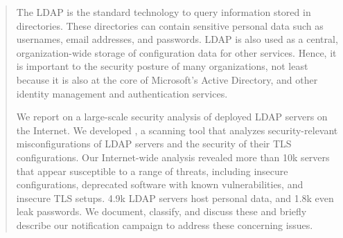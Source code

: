 \begin{abstract}
The \acrfull{LDAP} is the standard technology to query information stored in directories. These directories can contain sensitive personal data such as usernames, email addresses, and passwords. LDAP is also used as a central, organization-wide storage of configuration data for other services. Hence, it is important to the security posture of many organizations, not least because it is also at the core of Microsoft's Active Directory, and other identity management and authentication services. 

We report on a large-scale security analysis of deployed LDAP servers on the Internet. We developed \mbox{\NAME}, a scanning tool that analyzes security-relevant misconfigurations of LDAP servers and the security of their TLS configurations. 
Our Internet-wide analysis revealed more than 10k servers that appear susceptible to a range of threats, including insecure configurations, deprecated software with known vulnerabilities, and insecure TLS setups. 4.9k LDAP servers host personal data, and 1.8k even leak passwords. We document, classify, and discuss these and briefly describe our notification campaign to address these concerning issues.





\end{abstract}